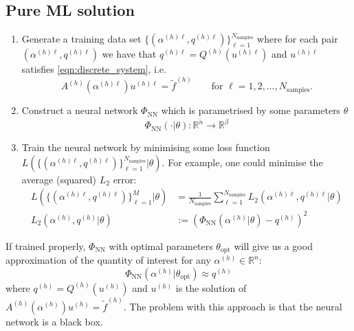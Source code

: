 \documentclass[11pt]{article}
\begin{document}
\subsection{Pure ML solution}\label{sec:pure_ml}
\begin{enumerate}
    \item Generate a training data set $\{(\alpha^{(h)\ell},q^{(h)\ell})\}_{\ell=1}^{N_{\text{samples}}}$ where for each pair $(\alpha^{(h)\ell},q^{(h)\ell})$ we have that $q^{(h)\ell}=Q^{(h)}(u^{(h)\ell})$ and $u^{(h)\ell}$ satisfies \eqref{eqn:discrete_system}, i.e. 
    \begin{equation}
        A^{(h)}(\alpha^{(h)\ell})u^{(h)\ell}=\widetilde{f}^{(h)}
        \qquad\text{for $\ell=1,2,\dots,N_{\text{samples}}$.}
    \end{equation}
    \item Construct a neural network $\Phi_{\text{NN}}$ which is parametrised by some parameters $\theta$
    \begin{equation}
        \Phi_{\text{NN}}(\cdot|\theta) : \mathbb{R}^{\widetilde{n}} \rightarrow \mathbb{R}^{\beta}
    \end{equation}
    \item Train the neural network by minimising some loss function $L(\{(\alpha^{(h)\ell},q^{(h)\ell})\}_{\ell=1}^{N_{\text{samples}}}|\theta)$.
For example, one could minimise the average (squared) $L_2$ error:
\begin{equation}
    \begin{aligned}
    L(\{(\alpha^{(h)\ell},q^{(h)\ell})\}_{\ell=1}^{M}|\theta) &= \frac{1}{N_{\text{samples}}}\sum_{\ell=1}^{N_{\text{samples}}} L_2(\alpha^{(h)\ell},q^{(h)\ell}|\theta)\\
    L_2(\alpha^{(h)},q^{(h)}|\theta) &:= \left(\Phi_{\text{NN}}(\alpha^{(h)}|\theta) - q^{(h)}\right)^2
    \end{aligned}
\end{equation}
\end{enumerate}
If trained properly, $\Phi_{\text{NN}}$ with optimal parameters $\theta_{\text{opt}}$ will give us a good approximation of the quantity of interest for any $\alpha^{(h)}\in\mathbb{R}^{n}$:
\begin{equation}
    \Phi_{\text{NN}}(\alpha^{(h)}|\theta_{\text{opt}}) \approx q^{(h)}
\end{equation}
where $q^{(h)}=Q^{(h)}(u^{(h)})$ and $u^{(h)}$ is the solution of $A^{(h)}(\alpha^{(h)}) u^{(h)}=\widetilde{f}^{(h)}$.
The problem with this approach is that the neural network is a black box.
\end{document}

